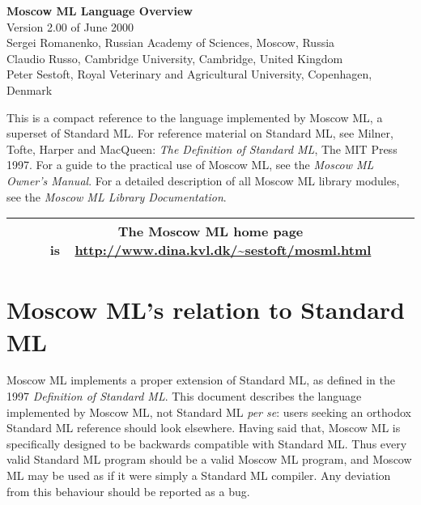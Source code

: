 \documentclass[fleqn,a4paper]{article}
\newcounter{extension}
\begin{document}
\begin{center}

  \vspace*{0cm}

{\huge\bf Moscow ML Language Overview}\\[0.5cm]

{Version 2.00 of June 2000}\\[1cm]

Sergei Romanenko, Russian Academy of Sciences, Moscow, Russia\\
Claudio Russo, Cambridge University, Cambridge, United Kingdom\\
Peter Sestoft, Royal Veterinary and Agricultural University, 
Copenhagen, Denmark
\end{center}

\noindent This is a compact reference to the language implemented by
Moscow ML, a superset of Standard ML\@.  For reference material on
Standard ML, see Milner, Tofte, Harper and MacQueen: {\em The
  Definition of Standard ML\/}, The MIT Press 1997.  For a guide to
the practical use of Moscow ML, see the \emph{Moscow ML Owner's
  Manual}.  For a detailed description of all Moscow ML library
modules, see the \emph{Moscow ML Library Documentation}.



\tableofcontents

\vfill

\begin{center}
\begin{tabular}{|c|}\hline
\rule[-0.4cm]{0cm}{1cm}The Moscow ML home page is\ \
    \url{http://www.dina.kvl.dk/~sestoft/mosml.html}\\\hline
\end{tabular}
\end{center}

\newpage 

\section{Moscow ML's relation to Standard ML}\label{sec-SMLcompliance}

Moscow ML implements a proper extension of Standard ML, 
as  defined in the 1997 {\em Definition of Standard ML\/}.
This document describes the language implemented by Moscow ML, not Standard ML 
\emph{per se}: users seeking an orthodox Standard ML reference should look elsewhere.
Having said that, Moscow ML is specifically designed to be backwards compatible with Standard ML. Thus every valid Standard ML program should be a valid
Moscow ML program, and Moscow ML may be used as if it were simply
a Standard ML compiler. Any deviation from this behaviour should be reported
as a bug.
\end{document}
